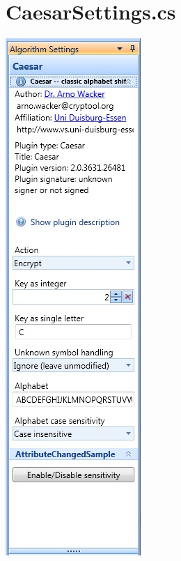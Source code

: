 \chapter{CaesarSettings.cs}
\label{app:CaesarSettings}

\begin{center}
		\includegraphics{figures/task_pane.jpg}
\end{center}

